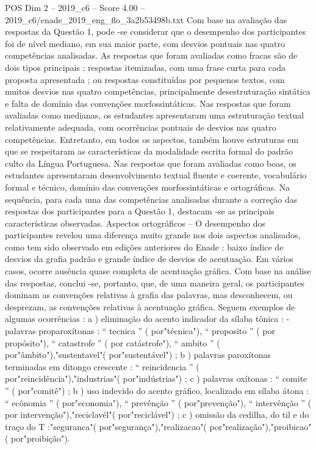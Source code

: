 \begin{textsample}{POS Dim 2 – 2019\_c6 – Score 4.00 – 2019\_c6/enade\_2019\_eng\_flo\_3a2b53498b.txt}
Com base na avaliação das respostas da Questão 1, pode -se considerar que o desempenho dos participantes foi de nível mediano, em sua maior parte, com desvios pontuais nas quatro competências analisadas.
As respostas que foram avaliadas como fracas são de dois tipos principais : respostas itemizadas, com uma frase curta para cada proposta apresentada ; ou respostas constituídas por pequenos textos, com muitos desvios nas quatro competências, principalmente desestruturação sintática e falta de domínio das convenções morfossintáticas.
Nas respostas que foram avaliadas como medianas, os estudantes apresentaram uma estruturação textual relativamente adequada, com ocorrências pontuais de desvios nas quatro competências.
Entretanto, em todos os aspectos, também houve estruturas em que se respeitaram as características da modalidade escrita formal do padrão culto da Língua Portuguesa.
Nas respostas que foram avaliadas como boas, os estudantes apresentaram desenvolvimento textual fluente e coerente, vocabulário formal e técnico, domínio das convenções morfossintáticas e ortográficas.
Na sequência, para cada uma das competências analisadas durante a correção das respostas dos participantes para a Questão 1, destacam -se as principais características observadas.
Aspectos ortográficos – O desempenho dos participantes revelou uma diferença muito grande nos dois aspectos analisados, como tem sido observado em edições anteriores do Enade : baixo índice de desvios da grafia padrão e grande índice de desvios de acentuação.
Em vários casos, ocorre ausência quase completa de acentuação gráfica.
Com base na análise das respostas, conclui -se, portanto, que, de uma maneira geral, os participantes dominam as convenções relativas à grafia das palavras, mas desconhecem, ou desprezam, as convenções relativas à acentuação gráfica.
Seguem exemplos de algumas ocorrências : a ) eliminação do acento indicador da sílaba tônica : - palavras proparoxítonas : “ tecnica ” ( por"técnica"), “ proposito ” ( por propósito"), “ catastrofe ” ( por catástrofe"), “ ambito ” ( por"âmbito"),"sustentavel"( por"sustentável") ; b ) palavras paroxítonas terminadas em ditongo crescente : “ reincidencia ” ( por"reincidência"),"industrias"( por"indústrias") ; c ) palavras oxítonas : “ comite ” ( por"comitê") ; b ) uso indevido do acento gráfico, localizado em sílaba átona : “ ecônomia ” ( por"economia"), “ prevênção ” ( por"prevenção"), “ intervênção ” ( por intervenção"),"reciclavél"( por"reciclável") ; c ) omissão da cedilha, do til e do traço do T :"seguranca"( por"segurança"),"realizacao"( por"realização"),"proibicao"( por"proibição").

\end{textsample}
